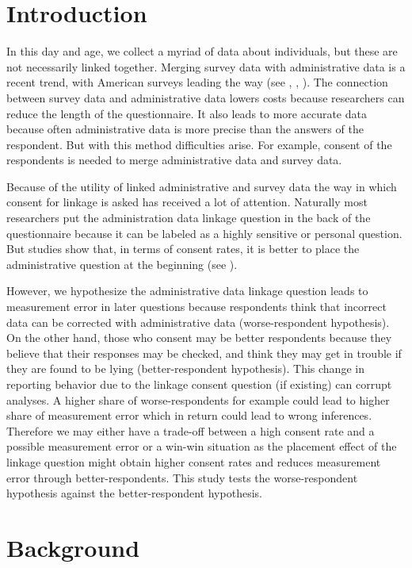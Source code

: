 \section{Introduction}

In this day and age, we collect a myriad of data about individuals, but these are not necessarily linked together. Merging survey data with administrative data is a recent trend, with American surveys leading the way (see \cite{Batesetal05}, \cite{Dahlhammeretal07}, \cite{Haideretal00}). The connection between survey data and administrative data lowers costs because researchers can reduce the length of the questionnaire. It also leads to more accurate data because often administrative data is more precise than the answers of the respondent. But with this method difficulties arise. For example, consent of the respondents is needed to merge administrative data and survey data.

Because of the utility of linked administrative and survey data the way in which consent for linkage is asked has received a lot of attention. Naturally most researchers put the administration data linkage question in the back of the questionnaire because it can be labeled as a highly sensitive or personal question. But studies show that, in terms of consent rates, it is better to place the administrative question at the beginning (see \cite{Sakshaugetal13}).

However, we hypothesize the administrative data linkage question leads to measurement error in later questions because respondents think that incorrect data can be corrected with administrative data (worse-respondent hypothesis). On the other hand, those who consent may be better respondents because they believe that their responses may be checked, and think they may get in trouble if they are found to be lying (better-respondent hypothesis). This change in reporting behavior due to the linkage consent question (if existing) can corrupt analyses. A higher share of worse-respondents for example could lead to higher share of measurement error which in return could lead to wrong inferences. Therefore we may either have a trade-off between a high consent rate and a possible measurement error or a win-win situation as the placement effect of the linkage question might obtain higher consent rates and reduces measurement error through better-respondents. This study tests the worse-respondent hypothesis against the better-respondent hypothesis.



\section{Background}

